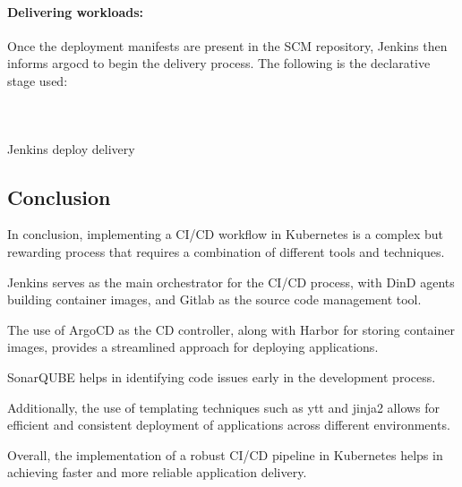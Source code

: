  
\paragraph{Delivering workloads: }

Once the deployment manifests are present in the SCM repository, Jenkins then informs argocd to begin the delivery process. The following is the declarative stage used: 

\begin{listing}[H]
    \inputminted[firstline=1,lastline=10]{Dockerfile}{codeListing/Jenkinsfile_deploy_delivery}
\end{listing}

\begin{listing}[H]
    \inputminted[firstline=11,lastline=45]{Dockerfile}{codeListing/Jenkinsfile_deploy_delivery}
\end{listing}

\begin{listing}[H]
    \inputminted[firstline=46]{Dockerfile}{codeListing/Jenkinsfile_deploy_delivery}
    \caption{Jenkins deploy delivery}
    \label{lst:jenkinsfile_deploy_delivery}
\end{listing}

\subsection*{Conclusion}
In conclusion, implementing a CI/CD workflow in Kubernetes is a complex but rewarding process that requires a combination of different tools and techniques. 

Jenkins serves as the main orchestrator for the CI/CD process, with DinD agents building container images, and Gitlab as the source code management tool. 

The use of ArgoCD as the CD controller, along with Harbor for storing container images, provides a streamlined approach for deploying applications. 

SonarQUBE helps in identifying code issues early in the development process. 

Additionally, the use of templating techniques such as ytt and jinja2 allows for efficient and consistent deployment of applications across different environments.  

Overall, the implementation of a robust CI/CD pipeline in Kubernetes helps in achieving faster and more reliable application delivery.
